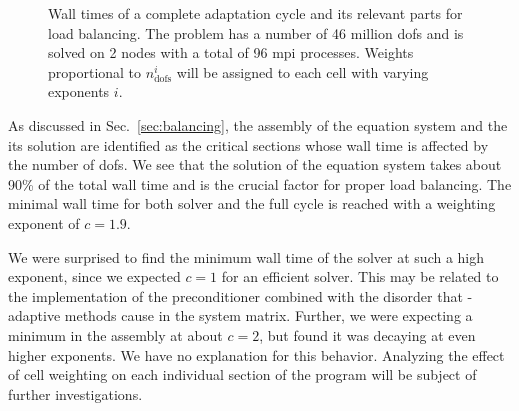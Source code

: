 \begin{figure}
\centering

\caption[Wall times for load balancing with varying weighting exponents.]{Wall times of a complete adaptation cycle and its relevant parts for load balancing. The problem has a number of 46 million \glspl{dof} and is solved on 2 nodes with a total of 96 \gls{mpi} processes. Weights proportional to $n_\text{dofs}^i$ will be assigned to each cell with varying exponents $i$.}
\label{fig:weights}
\end{figure}

As discussed in Sec.~\ref{sec:balancing}, the assembly of the equation system and the its solution are identified as the critical sections whose wall time is affected by the number of \glspl{dof}. We see that the solution of the equation system takes about 90\% of the total wall time and is the crucial factor for proper load balancing. The minimal wall time for both solver and the full cycle is reached with a weighting exponent of $c = 1.9$.

We were surprised to find the minimum wall time of the solver at such a high exponent, since we expected $c = 1$ for an efficient solver. This may be related to the implementation of the preconditioner combined with the disorder that \hp-adaptive methods cause in the system matrix. Further, we were expecting a minimum in the assembly at about $c = 2$, but found it was decaying at even higher exponents. We have no explanation for this behavior. Analyzing the effect of cell weighting on each individual section of the program
will be subject of further investigations.

